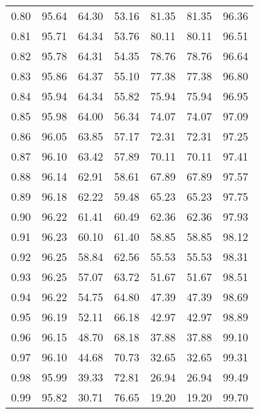\begin{tabular}{|c|c|c|c|c|c|c|}
      0.80 &     95.64 &     64.30 &      53.16 &   81.35 &      81.35 &         96.36 \\
      0.81 &     95.71 &     64.34 &      53.76 &   80.11 &      80.11 &         96.51 \\
      0.82 &     95.78 &     64.31 &      54.35 &   78.76 &      78.76 &         96.64 \\
      0.83 &     95.86 &     64.37 &      55.10 &   77.38 &      77.38 &         96.80 \\
      0.84 &     95.94 &     64.34 &      55.82 &   75.94 &      75.94 &         96.95 \\
      0.85 &     95.98 &     64.00 &      56.34 &   74.07 &      74.07 &         97.09 \\
      0.86 &     96.05 &     63.85 &      57.17 &   72.31 &      72.31 &         97.25 \\
      0.87 &     96.10 &     63.42 &      57.89 &   70.11 &      70.11 &         97.41 \\
      0.88 &     96.14 &     62.91 &      58.61 &   67.89 &      67.89 &         97.57 \\
      0.89 &     96.18 &     62.22 &      59.48 &   65.23 &      65.23 &         97.75 \\
      0.90 &     96.22 &     61.41 &      60.49 &   62.36 &      62.36 &         97.93 \\
      0.91 &     96.23 &     60.10 &      61.40 &   58.85 &      58.85 &         98.12 \\
      0.92 &     96.25 &     58.84 &      62.56 &   55.53 &      55.53 &         98.31 \\
      0.93 &     96.25 &     57.07 &      63.72 &   51.67 &      51.67 &         98.51 \\
      0.94 &     96.22 &     54.75 &      64.80 &   47.39 &      47.39 &         98.69 \\
      0.95 &     96.19 &     52.11 &      66.18 &   42.97 &      42.97 &         98.89 \\
      0.96 &     96.15 &     48.70 &      68.18 &   37.88 &      37.88 &         99.10 \\
      0.97 &     96.10 &     44.68 &      70.73 &   32.65 &      32.65 &         99.31 \\
      0.98 &     95.99 &     39.33 &      72.81 &   26.94 &      26.94 &         99.49 \\
      0.99 &     95.82 &     30.71 &      76.65 &   19.20 &      19.20 &         99.70 \\
\bottomrule
\end{tabular}
